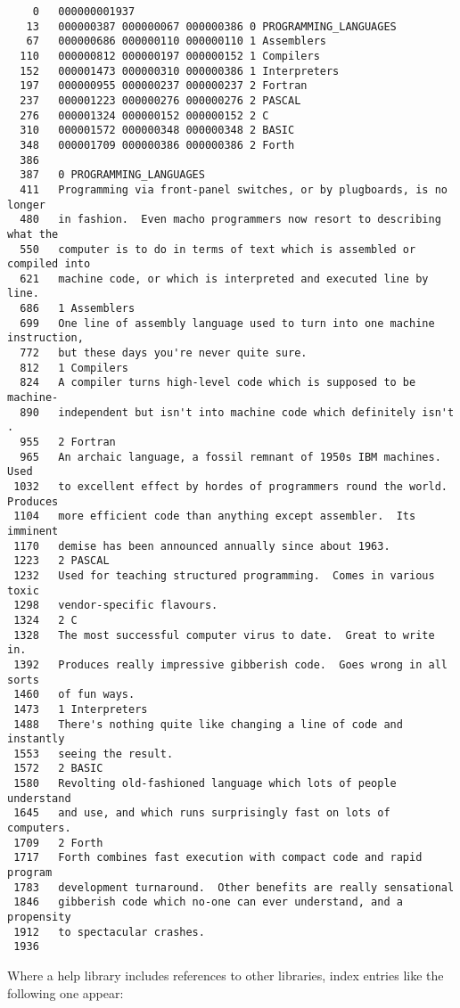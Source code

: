 \begin{small}
\begin{verbatim}
    0   000000001937
   13   000000387 000000067 000000386 0 PROGRAMMING_LANGUAGES
   67   000000686 000000110 000000110 1 Assemblers
  110   000000812 000000197 000000152 1 Compilers
  152   000001473 000000310 000000386 1 Interpreters
  197   000000955 000000237 000000237 2 Fortran
  237   000001223 000000276 000000276 2 PASCAL
  276   000001324 000000152 000000152 2 C
  310   000001572 000000348 000000348 2 BASIC
  348   000001709 000000386 000000386 2 Forth
  386
  387   0 PROGRAMMING_LANGUAGES
  411   Programming via front-panel switches, or by plugboards, is no longer
  480   in fashion.  Even macho programmers now resort to describing what the
  550   computer is to do in terms of text which is assembled or compiled into
  621   machine code, or which is interpreted and executed line by line.
  686   1 Assemblers
  699   One line of assembly language used to turn into one machine instruction,
  772   but these days you're never quite sure.
  812   1 Compilers
  824   A compiler turns high-level code which is supposed to be machine-
  890   independent but isn't into machine code which definitely isn't .
  955   2 Fortran
  965   An archaic language, a fossil remnant of 1950s IBM machines.  Used
 1032   to excellent effect by hordes of programmers round the world.  Produces
 1104   more efficient code than anything except assembler.  Its imminent
 1170   demise has been announced annually since about 1963.
 1223   2 PASCAL
 1232   Used for teaching structured programming.  Comes in various toxic
 1298   vendor-specific flavours.
 1324   2 C
 1328   The most successful computer virus to date.  Great to write in.
 1392   Produces really impressive gibberish code.  Goes wrong in all sorts
 1460   of fun ways.
 1473   1 Interpreters
 1488   There's nothing quite like changing a line of code and instantly
 1553   seeing the result.
 1572   2 BASIC
 1580   Revolting old-fashioned language which lots of people understand
 1645   and use, and which runs surprisingly fast on lots of computers.
 1709   2 Forth
 1717   Forth combines fast execution with compact code and rapid program
 1783   development turnaround.  Other benefits are really sensational
 1846   gibberish code which no-one can ever understand, and a propensity
 1912   to spectacular crashes.
 1936
\end{verbatim}
\end{small}

Where a help library includes references to other libraries, index
entries like the following one appear:

